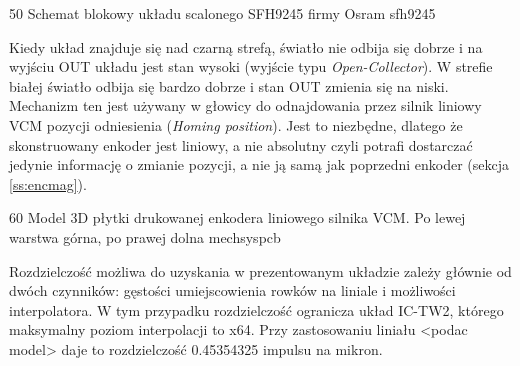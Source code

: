 	{50}
	{Schemat blokowy układu scalonego SFH9245 firmy Osram}
	{sfh9245}

Kiedy układ znajduje się nad czarną strefą, światło nie odbija się dobrze i na wyjściu OUT układu jest stan wysoki (wyjście typu {\it Open-Collector}). W strefie białej światło odbija się bardzo dobrze i stan OUT zmienia się na niski. Mechanizm ten jest używany w głowicy do odnajdowania przez silnik liniowy VCM pozycji odniesienia ({\it Homing position}). Jest to niezbędne, dlatego że skonstruowany enkoder jest liniowy, a nie absolutny czyli potrafi dostarczać jedynie informację o zmianie pozycji, a nie ją samą jak poprzedni enkoder (sekcja \ref{ss:encmag}).

	{60}
	{Model 3D płytki drukowanej enkodera liniowego silnika VCM. Po lewej warstwa górna, po prawej dolna}
	{mechsyspcb}

Rozdzielczość możliwa do uzyskania w prezentowanym układzie zależy głównie od dwóch czynników: gęstości umiejscowienia rowków na liniale i możliwości interpolatora. W tym przypadku rozdzielczość ogranicza układ IC-TW2, którego maksymalny poziom interpolacji to x64. Przy zastosowaniu liniału <podac model> daje to rozdzielczość 0.45354325 impulsu na mikron.



\clearpage















